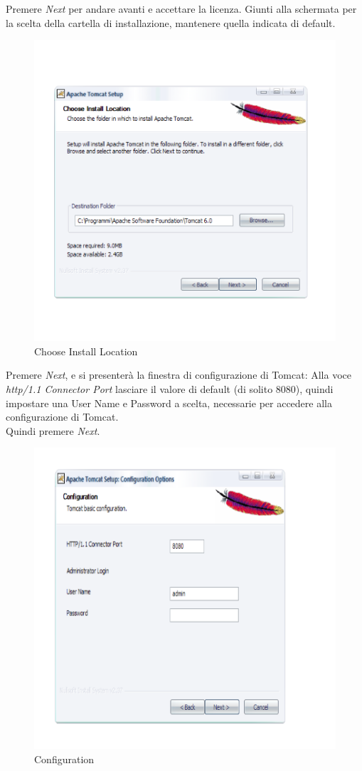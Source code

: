 Premere \textit{Next} per andare avanti e accettare la licenza.
Giunti alla schermata per la scelta della cartella di installazione, mantenere quella indicata di default.
 
\begin{figure}[!ht]
\centering
\includegraphics[scale=0.7]{images/InstallTomcat2.png}
\caption{Choose Install Location}
\end{figure}
\newpage
 
Premere \textit{Next}, e si presenter\`a la finestra di configurazione di Tomcat:
Alla voce \textit{http/1.1 Connector Port} lasciare il valore di default (di solito 8080), quindi impostare una User Name e Password a scelta, necessarie per accedere alla configurazione di Tomcat.\\
Quindi premere \textit{Next}.
 
\begin{figure}[!ht]
\centering
\includegraphics[scale=0.7]{images/InstallTomcat3.png}
\caption{Configuration}
\end{figure}
 
